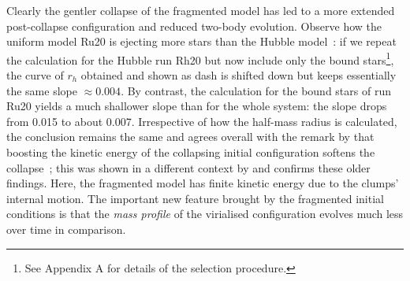 %
Clearly the gentler collapse of the fragmented model has led to a more extended post-collapse configuration and reduced two-body evolution. Observe how the uniform model Ru20 is ejecting more stars than the Hubble model~: if we repeat the calculation for the Hubble run Rh20 but now include only the bound stars\footnote{See Appendix A for details of the selection procedure.}, the curve of $r_h$ obtained and shown as dash is shifted down but keeps essentially the same slope $\approx  0.004$. By contrast, the calculation for the bound stars of run Ru20 yields a much shallower slope than for the whole system: the slope drops from 0.015 to about 0.007. Irrespective of how the half-mass radius is calculated, the conclusion remains the same and agrees overall with the remark by \cite{caputo14} that boosting the kinetic energy of the collapsing initial configuration softens the collapse~; this was shown in a different context by \cite{theis99} and confirms these older findings.  Here, the fragmented model has finite kinetic energy due to the clumps' internal motion. The important new feature brought by the fragmented initial conditions is that the {\it mass profile} of the virialised configuration evolves much less over time in comparison. 

%
%



